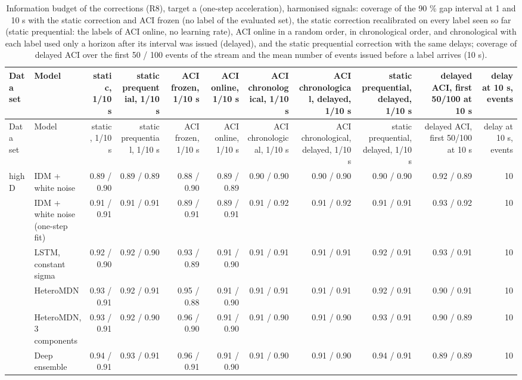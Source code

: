 \begin{longtable}{llrrrrrrrrr}
\caption{Information budget of the corrections (R8), target a (one-step acceleration), harmonised signals: coverage of the 90 \% gap interval at 1 and 10 s with the static correction and ACI frozen (no label of the evaluated set), the static correction recalibrated on every label seen so far (static prequential: the labels of ACI online, no learning rate), ACI online in a random order, in chronological order, and chronological with each label used only a horizon after its interval was issued (delayed), and the static prequential correction with the same delays; coverage of delayed ACI over the first 50 / 100 events of the stream and the mean number of events issued before a label arrives (10 s).}\label{tab:t4-info-budget--harmonised--a} \\
\toprule
Data set & Model & static, 1/10 s & static prequential, 1/10 s & ACI frozen, 1/10 s & ACI online, 1/10 s & ACI chronological, 1/10 s & ACI chronological, delayed, 1/10 s & static prequential, delayed, 1/10 s & delayed ACI, first 50/100 at 10 s & delay at 10 s, events \\
\midrule
\endfirsthead
\toprule
Data set & Model & static, 1/10 s & static prequential, 1/10 s & ACI frozen, 1/10 s & ACI online, 1/10 s & ACI chronological, 1/10 s & ACI chronological, delayed, 1/10 s & static prequential, delayed, 1/10 s & delayed ACI, first 50/100 at 10 s & delay at 10 s, events \\
\midrule
\endhead
\bottomrule
\endlastfoot
highD & IDM + white noise & 0.89 / 0.90 & 0.89 / 0.89 & 0.88 / 0.90 & 0.89 / 0.89 & 0.90 / 0.90 & 0.90 / 0.90 & 0.90 / 0.90 & 0.92 / 0.89 & 10 \\
 & IDM + white noise (one-step fit) & 0.91 / 0.91 & 0.91 / 0.91 & 0.89 / 0.91 & 0.89 / 0.91 & 0.91 / 0.92 & 0.91 / 0.92 & 0.91 / 0.91 & 0.93 / 0.92 & 10 \\
 & LSTM, constant sigma & 0.92 / 0.90 & 0.92 / 0.90 & 0.93 / 0.89 & 0.91 / 0.90 & 0.91 / 0.91 & 0.91 / 0.91 & 0.92 / 0.91 & 0.93 / 0.91 & 10 \\
 & HeteroMDN & 0.93 / 0.91 & 0.92 / 0.91 & 0.95 / 0.88 & 0.91 / 0.90 & 0.91 / 0.91 & 0.91 / 0.91 & 0.92 / 0.91 & 0.90 / 0.91 & 10 \\
 & HeteroMDN, 3 components & 0.93 / 0.91 & 0.92 / 0.90 & 0.96 / 0.90 & 0.91 / 0.90 & 0.91 / 0.90 & 0.91 / 0.90 & 0.93 / 0.91 & 0.90 / 0.89 & 10 \\
 & Deep ensemble & 0.94 / 0.91 & 0.93 / 0.91 & 0.96 / 0.91 & 0.91 / 0.90 & 0.91 / 0.90 & 0.91 / 0.90 & 0.94 / 0.91 & 0.89 / 0.89 & 10 \\

\end{longtable}
